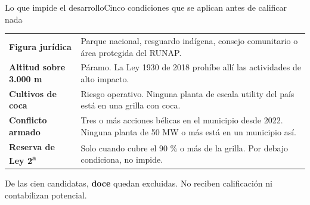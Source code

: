 \documentclass[aspectratio=169, 11pt]{beamer}
\begin{document}
\begin{frame}{Lo que impide el desarrollo}{Cinco condiciones que se aplican antes de calificar nada}
  \vspace{0.2em}
  {\footnotesize
  \begin{tabular}{@{}>{\raggedright\arraybackslash}p{3.5cm} >{\raggedright\arraybackslash}p{10.0cm}@{}}
    \toprule
    \textbf{Figura jurídica} & Parque nacional, resguardo indígena, consejo comunitario o área protegida del RUNAP.\\
    \textbf{Altitud sobre 3.000 m} & Páramo. La Ley 1930 de 2018 prohíbe allí las actividades de alto impacto.\\
    \textbf{Cultivos de coca} & Riesgo operativo. Ninguna planta de escala utility del país está en una grilla con coca.\\
    \textbf{Conflicto armado} & Tres o más acciones bélicas en el municipio desde 2022. Ninguna planta de 50 MW o más está en un municipio así.\\
    \textbf{Reserva de Ley 2\textsuperscript{a}} & Solo cuando cubre el 90 \% o más de la grilla. Por debajo condiciona, no impide.\\
    \bottomrule
  \end{tabular}}

  \vspace{0.9em}
  \hspace{0.01\textwidth}\begin{minipage}{0.96\textwidth}
    \raggedright\footnotesize\textcolor{tinta2}{De las cien candidatas, \textbf{doce}
    quedan excluidas. No reciben calificación ni contabilizan potencial.}
  \end{minipage}
\end{frame}
\end{document}
